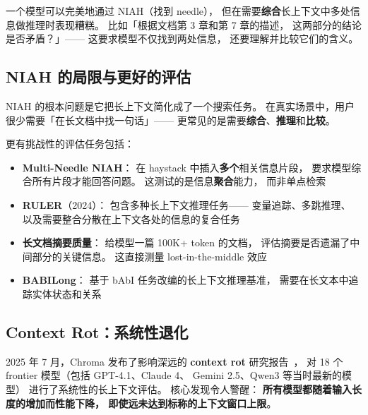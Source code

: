 一个模型可以完美地通过 NIAH（找到 needle），
但在需要\textbf{综合}长上下文中多处信息做推理时表现糟糕。
比如「根据文档第 3 章和第 7 章的描述，
这两部分的结论是否矛盾？」——
这要求模型不仅找到两处信息，
还要理解并比较它们的含义。

\subsection{NIAH 的局限与更好的评估}

NIAH 的根本问题是它把长上下文简化成了一个搜索任务。
在真实场景中，用户很少需要「在长文档中找一句话」——
更常见的是需要\textbf{综合}、\textbf{推理}和\textbf{比较}。

更有挑战性的评估任务包括：
\begin{itemize}[noitemsep]
  \item \textbf{Multi-Needle NIAH}：
        在 haystack 中插入\textbf{多个}相关信息片段，
        要求模型综合所有片段才能回答问题。
        这测试的是信息\textbf{聚合}能力，
        而非单点检索
  \item \textbf{RULER}（2024）：
        包含多种长上下文推理任务——
        变量追踪、多跳推理、
        以及需要整合分散在上下文各处的信息的复合任务
  \item \textbf{长文档摘要质量}：
        给模型一篇 100K+ token 的文档，
        评估摘要是否遗漏了中间部分的关键信息。
        这直接测量 lost-in-the-middle 效应
  \item \textbf{BABILong}：
        基于 bAbI 任务改编的长上下文推理基准，
        需要在长文本中追踪实体状态和关系
\end{itemize}

\subsection{Context Rot：系统性退化}

2025 年 7 月，Chroma 发布了影响深远的
\textbf{context rot} 研究报告~\cite{chroma2025contextrot}，
对 18 个 frontier 模型（包括 GPT-4.1、Claude 4、
Gemini 2.5、Qwen3 等当时最新的模型）
进行了系统性的长上下文评估。
核心发现令人警醒：
\textbf{所有模型都随着输入长度的增加而性能下降，
即使远未达到标称的上下文窗口上限}。

